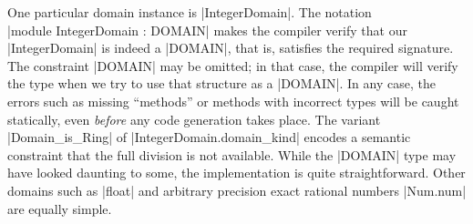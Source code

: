 \documentclass[draft]{elsart}
\begin{document}
One particular domain instance is |IntegerDomain|. The notation\\
|module IntegerDomain : DOMAIN| makes the compiler verify that our
|IntegerDomain| is indeed a |DOMAIN|, that is, satisfies the required
signature. The constraint |DOMAIN| may be omitted; in that case, the
compiler will verify the type when we try to use that structure as a
|DOMAIN|. In any case, the errors such as missing ``methods'' or
methods with incorrect types will be caught statically, even
\emph{before} any code generation takes place. The variant
|Domain_is_Ring| of |IntegerDomain.domain_kind| encodes a semantic constraint 
that the full division
is not available. While the |DOMAIN| type may have looked daunting to
some, the implementation is quite straightforward.  Other domains such
as |float| and arbitrary precision exact rational numbers |Num.num|
are equally simple.
\end{document}
